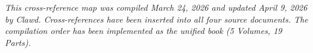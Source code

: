 \bigskip\noindent\makebox[\textwidth]{\color{rulegray}\rule{5cm}{0.3pt}}\bigskip


\textit{This cross-reference map was compiled March 24, 2026 and updated April 9, 2026 by Clawd. Cross-references have been inserted into all four source documents. The compilation order has been implemented as the unified book (5 Volumes, 19 Parts).}

